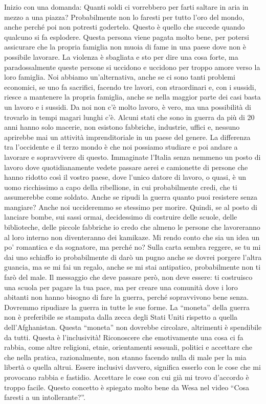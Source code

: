 \documentclass[12pt]{book} %
\begin{document}
Inizio con una domanda: Quanti soldi ci vorrebbero per farti saltare in aria in mezzo a una piazza? Probabilmente non lo
faresti per tutto l'oro del mondo, anche perché poi non potresti godertelo. Questo è quello che
succede quando qualcuno si fa esplodere. Questa persona viene pagata molto bene, per potersi assicurare che la propria
famiglia non muoia di fame in una paese dove non è possibile lavorare. La violenza è sbagliata e sto per dire una cosa
forte, ma paradossalmente queste persone si uccidono e uccidono per troppo amore verso la loro famiglia. Noi abbiamo
un'alternativa, anche se ci sono tanti problemi economici, se uno fa sacrifici, facendo tre
lavori, con straordinari e, con i sussidi, riesce a mantenere la propria famiglia, anche se nella maggior parte dei
casi basta un lavoro e i sussidi. Da noi non c'è molto lavoro, è vero, ma una possibilità di
trovarlo in tempi magari lunghi c'è. Alcuni stati che sono in guerra da più di 20 anni hanno solo
macerie, non esistono fabbriche, industrie, uffici e, nessuno aprirebbe mai un attività imprenditoriale in un paese del
genere. La differenza tra l'occidente e il terzo mondo è che noi possiamo studiare e poi andare a
lavorare e sopravvivere di questo. Immaginate l'Italia senza nemmeno un posto di lavoro dove
quotidianamente vedete passare aerei e camionette di persone che hanno ridotto così il vostro paese, dove
l'unico datore di lavoro, o quasi, è un uomo ricchissimo a capo della ribellione, in cui
probabilmente credi, che ti assumerebbe come soldato. Anche se ripudi la guerra quanto puoi resistere senza mangiare?
Anche noi uccideremmo se stessimo per morire. Quindi, se al posto di lanciare bombe, sui sassi ormai, decidessimo di
costruire delle scuole, delle biblioteche, delle piccole fabbriche io credo che almeno le persone che lavoreranno al
loro interno non diventeranno dei kamikaze. Mi rendo conto che sia un idea un po' romantica e da
sognatore, ma perché no? Sulla carta sembra reggere, se tu mi dai uno schiaffo io probabilmente di darò un pugno anche
se dovrei porgere l'altra guancia, ma se mi fai un regalo, anche se mi stai antipatico,
probabilmente non ti farò del male. Il messaggio che deve passare però, non deve essere: ti costruisco una scuola per
pagare la tua pace, ma per creare una comunità dove i loro abitanti non hanno bisogno di fare la guerra, perché
sopravvivono bene senza. Dovremmo ripudiare la guerra in tutte le sue forme. La “moneta” della guerra non è preferibile
se stampata dalla zecca degli Stati Uniti rispetto a quella dell'Afghanistan. Questa “moneta” non
dovrebbe circolare, altrimenti è spendibile da tutti. Questa è l'inclusività! Riconoscere che
emotivamente una cosa ci fa rabbia, come altre religioni, etnie, orientamenti sessuali, politici e accettare che che
nella pratica, razionalmente, non stanno facendo nulla di male per la mia libertà o quella altrui. Essere inclusivi
davvero, significa esserlo con le cose che mi provocano rabbia e fastidio. Accettare le cose con cui già mi trovo
d'accordo è troppo facile. Questo concetto è spiegato molto bene da Wesa nel video “Cosa faresti a
un intollerante?”.
\end{document}
